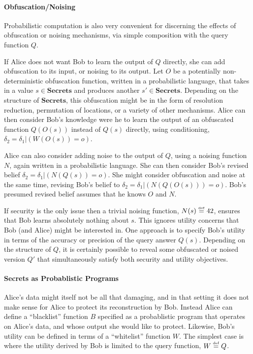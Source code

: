 \documentclass{article} %
\newcommand{\secrets}[0]{\textbf{Secrets}}
\newcommand{\asecret}[0]{s}
\newcommand{\rsecret}[0]{s}
\newcommand{\paren}[1]{\left( #1 \right)}
\newcommand{\cond}[0]{|}
\newcommand{\stacklabel}[1]{\stackrel{\smash{\scriptscriptstyle \mathrm{#1}}}}
\newcommand{\defeq}{\stacklabel{def}=}
\theoremstyle{plain} %
\theoremstyle{definition} %
\begin{document}
\paragraph*{Obfuscation/Noising} Probabilistic computation is also very
convenient for discerning the effects of obfuscation or noising
mechanisms, via simple composition with the query function $ Q $.

If Alice does not want Bob to learn the output of $ Q $ directly, she
can add obfuscation to its input, or noising to its output. Let $ O $
be a potentially non-deterministic obfuscation function, written in a
probabilistic language, that takes in a value $ \asecret \in \secrets
$ and produces another $ \asecret' \in \secrets $. Depending on the
structure of $ \secrets $, this obfuscation might be in the form of
resolution reduction, permutation of locations, or a variety of other
mechanisms. Alice can then consider Bob's knowledge were he to learn
the output of an obfuscated function $ Q(O(\rsecret)) $ instead of $
Q(\rsecret) $ directly, using conditioning, $ \delta_2 = \delta_1
\cond \paren{W(O(\rsecret)) = o} $.

Alice can also consider adding noise to the output of $ Q $, using a
noising function $ N $, again written in a probabilistic language. She
can then consider Bob's revised belief $ \delta_2 = \delta_1 \cond
\paren{N(Q(\rsecret)) = o} $. She might consider obfuscation and noise
at the same time, revising Bob's belief to $ \delta_2 = \delta_1 \cond
\paren{N(Q(O(\rsecret))) = o} $. Bob's presumed revised belief assumes
that he knows $ O $ and $ N $.

If security is the only issue
then a trivial noising function, $ N(\rsecret) \defeq 42 $, ensures
that Bob learns absolutely nothing about $ \rsecret $.
This ignores utility concerns that Bob (and Alice) might be
interested in. One approach is to specify Bob's utility in terms of
the accuracy or precision of the query answer $ Q(\rsecret) $.
Depending on the structure of $ Q $, it is certainly
possible to reveal some obfuscated or noised version $Q'$ that simultaneously
satisfy both security and utility objectives.

\paragraph*{Secrets as Probablistic Programs}

Alice's data might itself not be all that damaging, and in that setting
it does not make sense for Alice to protect its reconstruction by Bob. Instead
Alice can define a ``blacklist'' function $ B $ specified as a probablistic
program that operates on Alice's data, and whose output she would like to protect.
Likewise, Bob's utility can be defined in terms of a ``whitelist'' function $
W $. The simplest case is where the utility derived by Bob is limited to the
query function, $ W \defeq Q $.
\end{document}
